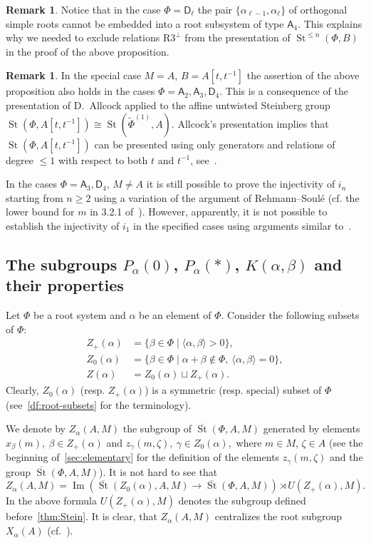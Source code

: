 \documentclass[oneside, 8pt]{amsart}
\theoremstyle{remark}
\theoremstyle{definition}
\numberwithin{lemma}{section}
\numberwithin{prop}{section}
\numberwithin{corollary}{section}
\numberwithin{externaltheorem}{section}
\newtheorem{rem}[lemma]{Remark}
\DeclareMathOperator{\Img}{Im}
\DeclareMathOperator{\St}{St}
\newcommand{\inv}{^{-1}}
\newcommand{\rA}{\mathsf{A}}
\newcommand{\rD}{\mathsf{D}}
\numberwithin{equation}{section}
\begin{document}
\begin{rem}
 Notice that in the case $\Phi=\rD_\ell$ the pair $\{\alpha_{\ell-1}, \alpha_{\ell}\}$ of orthogonal simple roots cannot be embedded into a root subsystem of type $\rA_4$. This explains why we needed to exclude relations $\text{R3}^\bot$ from the presentation of $\St^{\leq n}(\Phi, B)$ in the proof of the above proposition.
\end{rem}
\begin{rem}
 In the special case $M=A$, $B = A[t, t\inv]$ the assertion of the above proposition also holds in the cases $\Phi=\rA_2, \rA_3, \rD_4$. This is a consequence of the presentation of D.~Allcock applied to the affine untwisted Steinberg group $\St(\Phi, A[t, t\inv]) \cong \St(\widetilde{\Phi}^{(1)}, A)$. Allcock's presentation implies that $\St(\Phi, A[t, t\inv])$ can be presented using only generators and relations of degree $\leq 1$ with respect to both $t$ and $t^{-1}$, see~\cite[Corollary~1.3]{A13}.
 
 In the cases $\Phi = \rA_3, \rD_4$, $M \neq A$ it is still possible to prove the injectivity of $i_n$ starting from $n\geq 2$ using a variation of the argument of Rehmann--Soul{\'e} (cf. the lower bound for $m$ in 3.2.1 of~\cite{RS76}). However, apparently, it is not possible to establish the injectivity of $i_1$ in the specified cases using arguments similar to~\cite{RS76}.
\end{rem}

\subsection{The subgroups \texorpdfstring{$P_\alpha(0)$}{Pa(0)}, \texorpdfstring{$P_\alpha(*)$}{Pa(*)}, \texorpdfstring{$K(\alpha, \beta)$}{K(a,b)} and their properties} \label{sec:Pa0-basic}
Let $\Phi$ be a root system and $\alpha$ be an element of $\Phi$.
Consider the following subsets of $\Phi$:
\begin{align} Z_+(\alpha) & = \{ \beta \in \Phi \mid \langle \alpha, \beta \rangle > 0 \}, \\
   Z_0(\alpha) & = \{ \beta \in \Phi \mid \alpha + \beta \not\in \Phi,\ \langle \alpha, \beta \rangle = 0 \}, \\
   Z(\alpha)   & = Z_0(\alpha) \sqcup Z_+(\alpha). \end{align}
Clearly, $Z_0(\alpha)$ (resp. $Z_+(\alpha)$) is a symmetric (resp. special) subset of $\Phi$ (see~\cref{df:root-subsets} for the terminology).
   
We denote by $Z_\alpha(A, M)$ the subgroup of $\overline{\St}(\Phi, A, M)$ generated by elements
 $x_{\beta}(m),\ \beta \in Z_+(\alpha)$ and $z_{\gamma}(m, \zeta),\ \gamma \in Z_0(\alpha),$ where $m \in M$, $\zeta \in A$ (see the beginning of~\cref{sec:elementary} for the definition of the elements $z_\gamma(m, \zeta)$ and the group $\overline{\St}(\Phi, A, M)$).
It is not hard to see that \[Z_\alpha(A, M) = \Img\left(\overline{\St}(Z_0(\alpha), A, M) \to \overline{\St}(\Phi, A, M)\right) \rtimes U(Z_+(\alpha), M). \]
In the above formula $U(Z_+(\alpha), M)$ denotes the subgroup defined before~\cref{thm:Stein}.
It is clear, that $Z_\alpha(A, M)$ centralizes the root subgroup $X_\alpha(A)$ (cf.~\cite[984]{St71}).
\end{document}
